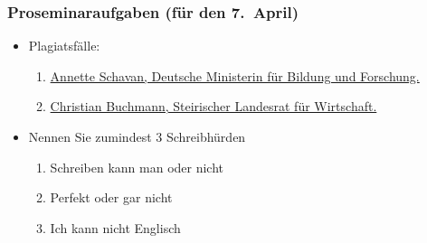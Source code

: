 \begin{frame}[fragile]
\frametitle{Proseminaraufgaben (für den 7.~April)}    

\begin{itemize}
\item<2-> Plagiatsfälle:
\begin{enumerate}
\item<3-> \href{http://de.wikipedia.org/w/index.php?title=Annette_Schavan}{Annette Schavan, Deutsche Ministerin für Bildung und Forschung.}
\item<4-> \href{https://de.wikipedia.org/wiki/Christian_Buchmann}{Christian Buchmann, Steirischer Landesrat für Wirtschaft.}
\end{enumerate}
\end{itemize}



\begin{itemize}
\item<7-> Nennen Sie zumindest 3 Schreibhürden
  \begin{enumerate}
  \item<8-> Schreiben kann man oder nicht
  \item<9-> Perfekt oder gar nicht
  \item<10-> Ich kann nicht Englisch
  \end{enumerate}
\end{itemize}

\end{frame}

